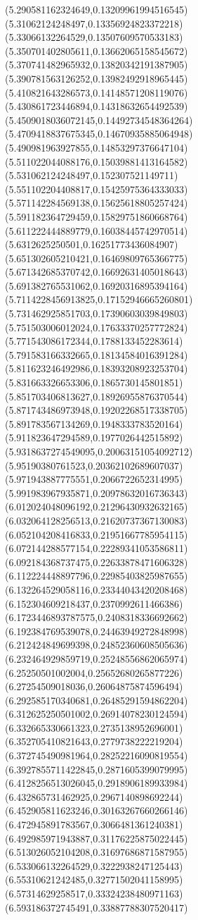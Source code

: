 {(5.290581162324649,0.13209961994516545)
(5.31062124248497,0.13356924823372218)
(5.33066132264529,0.13507609570533183)
(5.350701402805611,0.13662065158545672)
(5.370741482965932,0.13820342191387905)
(5.390781563126252,0.13982492918965445)
(5.410821643286573,0.14148571208119076)
(5.430861723446894,0.14318632654492539)
(5.4509018036072145,0.14492734548364264)
(5.4709418837675345,0.14670935885064948)
(5.490981963927855,0.14853297376647104)
(5.511022044088176,0.15039881413164582)
(5.531062124248497,0.152307521149711)
(5.551102204408817,0.15425975364333033)
(5.571142284569138,0.15625618805257424)
(5.591182364729459,0.15829751860668764)
(5.611222444889779,0.16038445742970514)
(5.6312625250501,0.16251773436084907)
(5.651302605210421,0.16469809765366775)
(5.671342685370742,0.16692631405018643)
(5.691382765531062,0.16920316895394164)
(5.7114228456913825,0.17152946665260801)
(5.731462925851703,0.17390603039849803)
(5.751503006012024,0.17633370257772824)
(5.771543086172344,0.1788133452283614)
(5.791583166332665,0.18134584016391284)
(5.811623246492986,0.18393208923253704)
(5.831663326653306,0.1865730145801851)
(5.851703406813627,0.18926955876370544)
(5.871743486973948,0.19202268517338705)
(5.891783567134269,0.1948333783520164)
(5.911823647294589,0.1977026442515892)
(5.9318637274549095,0.20063151054092712)
(5.95190380761523,0.20362102689607037)
(5.971943887775551,0.2066722652314995)
(5.991983967935871,0.20978632016736343)
(6.012024048096192,0.21296430932632165)
(6.032064128256513,0.21620737367130083)
(6.052104208416833,0.21951667785954115)
(6.072144288577154,0.22289341053586811)
(6.092184368737475,0.22633878471606328)
(6.112224448897796,0.22985403825987655)
(6.132264529058116,0.23344043420208468)
(6.152304609218437,0.2370992611466386)
(6.1723446893787575,0.2408318336692662)
(6.192384769539078,0.24463949272848998)
(6.212424849699398,0.24852360608505636)
(6.232464929859719,0.25248556862065974)
(6.25250501002004,0.25652680265877226)
(6.27254509018036,0.26064875874596494)
(6.292585170340681,0.26485291594862204)
(6.312625250501002,0.26914078230124594)
(6.332665330661323,0.2735138952696001)
(6.352705410821643,0.2779738222219204)
(6.372745490981964,0.28252216090819554)
(6.3927855711422845,0.2871605399079995)
(6.4128256513026045,0.2918906189933984)
(6.432865731462925,0.2967140898692244)
(6.452905811623246,0.30163267660266146)
(6.472945891783567,0.3066481361240381)
(6.492985971943887,0.31176225875022445)
(6.513026052104208,0.31697686871587955)
(6.533066132264529,0.3222938247125443)
(6.55310621242485,0.32771502041158995)
(6.57314629258517,0.33324238480971163)
(6.593186372745491,0.33887788307520417)
}
